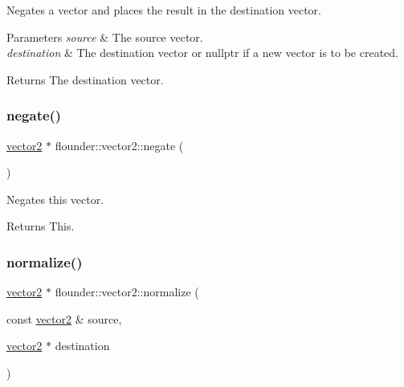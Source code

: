 Negates a vector and places the result in the destination vector. 


\begin{DoxyParams}{Parameters}
{\em source} & The source vector. \\
\hline
{\em destination} & The destination vector or nullptr if a new vector is to be created. \\
\hline
\end{DoxyParams}
\begin{DoxyReturn}{Returns}
The destination vector. 
\end{DoxyReturn}
\mbox{\label{classflounder_1_1vector2_a0fa7eef12302eaa8cd4f4ff030231e3d}} 
\subsubsection{\texorpdfstring{negate()}{negate()}\hspace{0.1cm}{\footnotesize\ttfamily [2/2]}}
{\footnotesize\ttfamily \hyperlink{classflounder_1_1vector2}{vector2} $\ast$ flounder\+::vector2\+::negate (\begin{DoxyParamCaption}{ }\end{DoxyParamCaption})}



Negates this vector. 

\begin{DoxyReturn}{Returns}
This. 
\end{DoxyReturn}
\mbox{\label{classflounder_1_1vector2_ac1bae04e41daf4ba46ae125db1c0b2b0}} 
\subsubsection{\texorpdfstring{normalize()}{normalize()}\hspace{0.1cm}{\footnotesize\ttfamily [1/2]}}
{\footnotesize\ttfamily \hyperlink{classflounder_1_1vector2}{vector2} $\ast$ flounder\+::vector2\+::normalize (\begin{DoxyParamCaption}\item[{const \hyperlink{classflounder_1_1vector2}{vector2} \&}]{source,  }\item[{\hyperlink{classflounder_1_1vector2}{vector2} $\ast$}]{destination }\end{DoxyParamCaption})\hspace{0.3cm}{\ttfamily [static]}}



